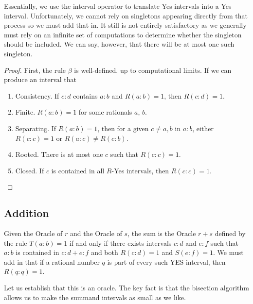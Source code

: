 \documentclass[12pt]{article}
\theoremstyle{remark}
\begin{document}
Essentially, we use the interval operator to translate Yes intervals into a Yes interval. Unfortunately, we cannot rely on singletons appearing directly from that process so we must add that in. It still is not entirely satisfactory as we generally must rely on an infinite set of computations to determine whether the singleton should be included. We can say, however, that there will be at most one such singleton. 

\begin{proof}
First, the rule $\beta$ is well-defined, up to computational limits. If we can produce an interval that 

\begin{enumerate}
    \item Consistency. If $c:d$ contains $a:b$ and $R(a:b) = 1$, then $R(c:d) = 1$.
    \item Finite. $R(a:b) = 1$ for some rationals $a$, $b$.
    \item Separating. If $R(a:b)=1$, then for a given $c \neq a, b$ in $a:b$, either $R(c:c) = 1$ or $R(a:c) \neq R(c:b)$. 
    \item Rooted. There is at most one $c$ such that $R(c:c) =1$.
    \item Closed. If $c$ is contained in all $R$-Yes intervals, then $R(c:c) = 1$.
\end{enumerate}

\end{proof}


\subsection{Addition}

Given the Oracle of $r$ and the Oracle of $s$, the sum is the Oracle $r+s$ defined by the rule $T(a:b) = 1$ if and only if there exists intervals $c:d$ and $e:f$ such that $a:b$ is contained in $c:d + e:f$ and both $R(c:d)=1$ and $S(e:f) = 1$. We must add in that if a rational number $q$ is part of every such YES interval, then $R(q:q) = 1$.

Let us establish that this is an oracle. The key fact is that the bisection algorithm allows us to make the summand intervals as small as we like. 
\end{document}
